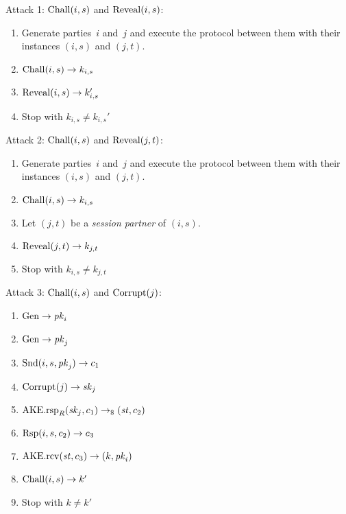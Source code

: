 \begin{minipage}[t]{.45\textwidth}
    Attack 1: $\mathrm{Chall}(i,s)$ and $\mathrm{Reveal}(i,s)$:
    \begin{enumerate}[topsep=\smallskipamount]
    \item Generate parties~$i$ and~$j$ and execute the protocol between them with their instances $(i,s)$ and $(j,t)$.
    \item $\mathrm{Chall}(i,s)\to k_{i,s}$
    \item $\mathrm{Reveal}(i,s)\to k_{i,s}'$
    \item Stop with $k_{i,s}\not= k_{i,s}'$
    \end{enumerate}
    \medskip
    Attack 2: $\mathrm{Chall}(i,s)$ and $\mathrm{Reveal}(j,t)$:
    \begin{enumerate}[topsep=\smallskipamount]
    \item Generate parties~$i$ and~$j$ and execute the protocol between them with their instances $(i,s)$ and $(j,t)$.
    \item $\mathrm{Chall}(i,s)\to k_{i,s}$
    \item Let $(j,t)$ be a \emph{session partner} of $(i,s)$.
    \item $\mathrm{Reveal}(j,t)\to k_{j,t}$
    \item Stop with $k_{i,s}\not= k_{j,t}$
    \end{enumerate}
\end{minipage}\hfill
\begin{minipage}[t]{.45\textwidth}
    Attack 3: $\mathrm{Chall}(i,s)$ and $\mathrm{Corrupt}(j)$:
    \begin{enumerate}[topsep=\smallskipamount]
    \item $\mathrm{Gen}\to\mathit{pk}_i$
    \item $\mathrm{Gen}\to\mathit{pk}_j$
    \item $\mathrm{Snd}(i,s,\mathit{pk}_j)\to c_1$
    \item $\mathrm{Corrupt}(j)\to\mathit{sk}_j$
    \item $\mathrm{AKE}.\mathrm{rsp}_R(\mathit{sk}_j,c_1)\to_\$(\mathit{st},c_2)$
    \item $\mathrm{Rsp}(i,s,c_2)\to c_3$
    \item $\mathrm{AKE}.\mathrm{rcv}(\mathit{st}, c_3)\to (k,\mathit{pk}_i)$
    \item $\mathrm{Chall}(i,s)\to k'$
    \item Stop with $k\not= k'$
    \end{enumerate}
\end{minipage}
